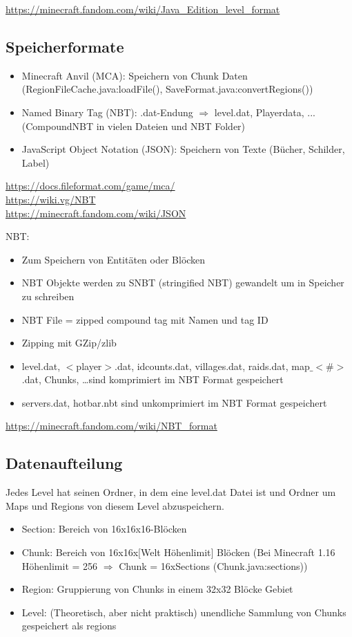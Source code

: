 \url{https://minecraft.fandom.com/wiki/Java_Edition_level_format}

\subsection{Speicherformate}
\begin{itemize}
    \item Minecraft Anvil (MCA): Speichern von Chunk Daten (RegionFileCache.java:loadFile(), SaveFormat.java:convertRegions())
    \item Named Binary Tag (NBT): .dat-Endung $\Rightarrow$ level.dat, Playerdata, ... (CompoundNBT in vielen Dateien und NBT Folder)
    \item JavaScript Object Notation (JSON): Speichern von Texte (Bücher, Schilder, Label)
\end{itemize}

\url{https://docs.fileformat.com/game/mca/}\\
\url{https://wiki.vg/NBT}\\
\url{https://minecraft.fandom.com/wiki/JSON}

NBT:
\begin{itemize}
    \item Zum Speichern von Entitäten oder Blöcken
    \item NBT Objekte werden zu SNBT (stringified NBT) gewandelt um in Speicher zu schreiben 
    \item NBT File = zipped compound tag mit Namen und tag ID 
    \item Zipping mit GZip/zlib
    \item level.dat, $<$player$>$.dat, idcounts.dat, villages.dat, raids.dat, map$\_$$<$\#$>$.dat, Chunks, \dots sind komprimiert im NBT Format gespeichert
    \item servers.dat, hotbar.nbt sind unkomprimiert im NBT Format gespeichert
\end{itemize}
\url{https://minecraft.fandom.com/wiki/NBT_format}

\subsection{Datenaufteilung} \label{ssec:datenaufteilung}
Jedes Level hat seinen Ordner, in dem eine level.dat Datei ist und Ordner um Maps und Regions von diesem Level abzuspeichern. 

\begin{itemize}
    \item Section: Bereich von 16x16x16-Blöcken
    \item Chunk: Bereich von 16x16x$[$Welt Höhenlimit$]$ Blöcken (Bei Minecraft 1.16 Höhenlimit = 256 $\Rightarrow{}$ Chunk = 16xSections (Chunk.java:sections))
    \item Region: Gruppierung von Chunks in einem 32x32 Blöcke Gebiet
    \item Level: (Theoretisch, aber nicht praktisch) unendliche Sammlung von Chunks gespeichert als regions
\end{itemize}

